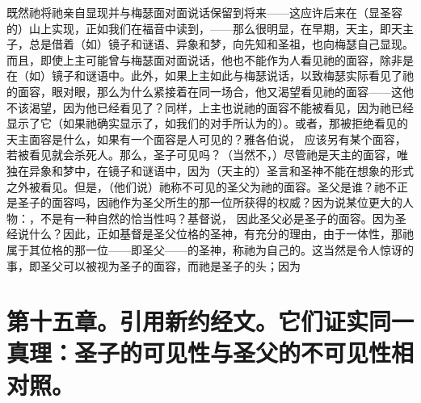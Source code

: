 既然祂将祂亲自显现并与梅瑟面对面说话保留到将来——这应许后来在（显圣容的）山上实现，正如我们在福音中读到，——那么很明显，在早期，天主，即天主子，总是借着（如）镜子和谜语、异象和梦，向先知和圣祖，也向梅瑟自己显现。而且，即使上主可能曾与梅瑟面对面说话，他也不能作为人看见祂的面容，除非是在（如）镜子和谜语中。此外，如果上主如此与梅瑟说话，以致梅瑟实际看见了祂的面容，眼对眼，那么为什么紧接着在同一场合，他又渴望看见祂的面容——这他不该渴望，因为他已经看见了？同样，上主也说祂的面容不能被看见，因为祂已经显示了它（如果祂确实显示了，如我们的对手所认为的）。或者，那被拒绝看见的天主面容是什么，如果有一个面容是人可见的？雅各伯说， 应该另有某个面容，若被看见就会杀死人。那么，圣子可见吗？（当然不，）尽管祂是天主的面容，唯独在异象和梦中，在镜子和谜语中，因为（天主的）圣言和圣神不能在想象的形式之外被看见。但是，（他们说）祂称不可见的圣父为祂的面容。圣父是谁？祂不正是圣子的面容吗，因祂作为圣父所生的那一位所获得的权威？因为说某位更大的人物：，不是有一种自然的恰当性吗？基督说， 因此圣父必是圣子的面容。因为圣经说什么？因此，正如基督是圣父位格的圣神，有充分的理由，由于一体性，那祂属于其位格的那一位——即圣父——的圣神，称祂为自己的。这当然是令人惊讶的事，即圣父可以被视为圣子的面容，而祂是圣子的头；因为\par


\section{第十五章。引用新约经文。它们证实同一真理：圣子的可见性与圣父的不可见性相对照。}

